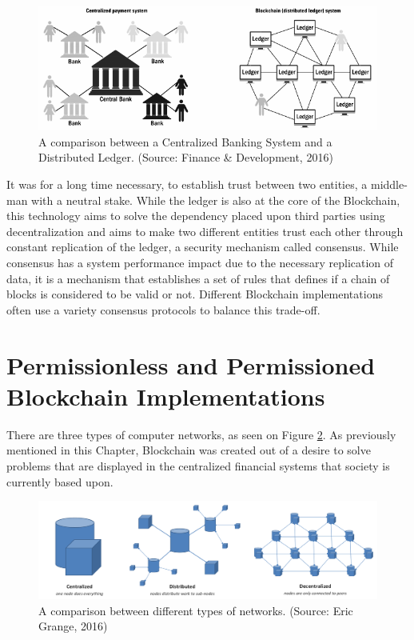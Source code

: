 \begin{figure}[h]
  \centering
  \includegraphics[width=1\linewidth]{imgs/blockchainvscentralizedNetwork.png}
  \caption{\label{fig:centralizedvsdescentralized} A comparison between a
  Centralized Banking System and a Distributed Ledger. (Source: Finance \&
  Development, 2016)}
\end{figure}

It was for a long time necessary, to establish trust between two entities, a
middle-man with a neutral stake. While the ledger is also at the core of the
Blockchain, this technology aims to solve the dependency placed upon third
parties using decentralization and aims to make two different entities trust
each other through constant replication of the ledger, a security mechanism
called consensus.  While consensus has a system performance impact due to the
necessary replication of data, it is a mechanism that establishes a set of
rules that defines if a chain of blocks is considered to be valid or not.
Different Blockchain implementations often use a variety consensus protocols to
balance this trade-off.

\section{Permissionless and Permissioned Blockchain Implementations}

There are three types of computer networks, as seen on Figure
\ref{fig:typesofnetworks}. As previously mentioned in this Chapter, Blockchain
was created out of a desire to solve problems that are displayed in the
centralized financial systems that society is currently based upon.

\begin{figure}[h]
	\centering
	\includegraphics[width=1\linewidth]{imgs/typesofnetworks.png}
  \caption{\label{fig:typesofnetworks} A comparison between different types of
  networks. (Source: Eric Grange, 2016)}
\end{figure}

